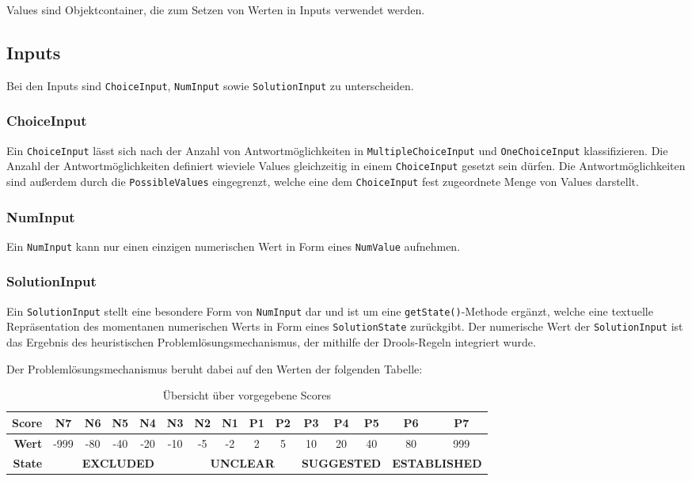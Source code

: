 \documentclass[a4paper,12pt]{report}
\begin{document}
Values sind Objektcontainer, die zum Setzen von Werten in Inputs verwendet werden. 

  \subsection{Inputs}

Bei den Inputs sind \texttt{ChoiceInput}, \texttt{NumInput} sowie \texttt{SolutionInput} zu unterscheiden.

  \subsubsection{ChoiceInput}
Ein \texttt{ChoiceInput} lässt sich nach der Anzahl von Antwortmöglichkeiten in \texttt{MultipleChoiceInput}
und \texttt{OneChoiceInput} klassifizieren. Die Anzahl der Antwortmöglichkeiten definiert
wieviele Values gleichzeitig in einem \texttt{ChoiceInput} gesetzt sein dürfen. Die Antwortmöglichkeiten
sind außerdem durch die \texttt{PossibleValues} eingegrenzt, welche eine dem \texttt{ChoiceInput} fest zugeordnete 
Menge von Values darstellt.

  \subsubsection{NumInput} %

Ein \texttt{NumInput} kann nur einen einzigen numerischen Wert in Form eines \texttt{NumValue} aufnehmen.
  
  \subsubsection{SolutionInput}
Ein \texttt{SolutionInput} stellt eine besondere Form von \texttt{NumInput} dar und ist um eine \texttt{getState()}-Methode ergänzt, 
welche eine textuelle Repräsentation des momentanen numerischen Werts in Form eines \texttt{SolutionState} zurückgibt. 
Der numerische Wert der \texttt{SolutionInput} ist das Ergebnis des heuristischen Problemlösungsmechanismus, der 
mithilfe der Drools-Regeln integriert wurde.

Der Problemlösungsmechanismus beruht dabei auf den Werten der folgenden Tabelle:

\begin{table}[!h]
\begin{tabular}{r|c|c|c|c|c|c|c||c|c|c|c|c|c|c}

\textbf{Score} & N7 & N6 & N5 & N4 & N3 & N2 & N1 & P1 & P2 & P3 & P4 & P5 & P6 & P7\\
\hline
\textbf{Wert} & -999 & -80 & -40 & -20 & -10 & -5 & -2 & 2 & 5 & 10 & 20 & 40 & 80 & 999\\
\hline
\textbf{State} & \multicolumn{5}{c|}{\textbf{EXCLUDED}} & \multicolumn{4}{c|}{\textbf{UNCLEAR}} & \multicolumn{3}{c|}{\textbf{SUGGESTED}} & \multicolumn{2}{c}{\textbf{ESTABLISHED}}
\end{tabular}
\caption{Übersicht über vorgegebene Scores}
\end{table}
\end{document}
